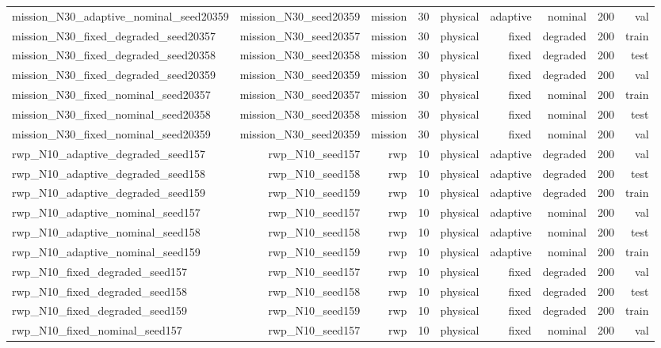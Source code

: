 \begin{tabular}{lrrrrrrrr}
mission\_N30\_adaptive\_nominal\_seed20359 & mission\_N30\_seed20359 & mission & 30 & physical & adaptive & nominal & 200 & val \\
mission\_N30\_fixed\_degraded\_seed20357 & mission\_N30\_seed20357 & mission & 30 & physical & fixed & degraded & 200 & train \\
mission\_N30\_fixed\_degraded\_seed20358 & mission\_N30\_seed20358 & mission & 30 & physical & fixed & degraded & 200 & test \\
mission\_N30\_fixed\_degraded\_seed20359 & mission\_N30\_seed20359 & mission & 30 & physical & fixed & degraded & 200 & val \\
mission\_N30\_fixed\_nominal\_seed20357 & mission\_N30\_seed20357 & mission & 30 & physical & fixed & nominal & 200 & train \\
mission\_N30\_fixed\_nominal\_seed20358 & mission\_N30\_seed20358 & mission & 30 & physical & fixed & nominal & 200 & test \\
mission\_N30\_fixed\_nominal\_seed20359 & mission\_N30\_seed20359 & mission & 30 & physical & fixed & nominal & 200 & val \\
rwp\_N10\_adaptive\_degraded\_seed157 & rwp\_N10\_seed157 & rwp & 10 & physical & adaptive & degraded & 200 & val \\
rwp\_N10\_adaptive\_degraded\_seed158 & rwp\_N10\_seed158 & rwp & 10 & physical & adaptive & degraded & 200 & test \\
rwp\_N10\_adaptive\_degraded\_seed159 & rwp\_N10\_seed159 & rwp & 10 & physical & adaptive & degraded & 200 & train \\
rwp\_N10\_adaptive\_nominal\_seed157 & rwp\_N10\_seed157 & rwp & 10 & physical & adaptive & nominal & 200 & val \\
rwp\_N10\_adaptive\_nominal\_seed158 & rwp\_N10\_seed158 & rwp & 10 & physical & adaptive & nominal & 200 & test \\
rwp\_N10\_adaptive\_nominal\_seed159 & rwp\_N10\_seed159 & rwp & 10 & physical & adaptive & nominal & 200 & train \\
rwp\_N10\_fixed\_degraded\_seed157 & rwp\_N10\_seed157 & rwp & 10 & physical & fixed & degraded & 200 & val \\
rwp\_N10\_fixed\_degraded\_seed158 & rwp\_N10\_seed158 & rwp & 10 & physical & fixed & degraded & 200 & test \\
rwp\_N10\_fixed\_degraded\_seed159 & rwp\_N10\_seed159 & rwp & 10 & physical & fixed & degraded & 200 & train \\
rwp\_N10\_fixed\_nominal\_seed157 & rwp\_N10\_seed157 & rwp & 10 & physical & fixed & nominal & 200 & val \\

\end{tabular}
